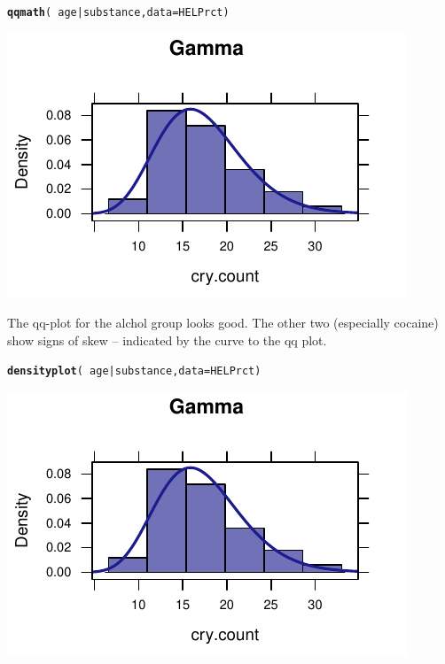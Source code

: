 \documentclass[twoside]{book}\usepackage[]{graphicx}\usepackage[]{xcolor}
\makeatletter
\def\maxwidth{ %
  \ifdim\Gin@nat@width>\linewidth
    \linewidth
  \else
    \Gin@nat@width
  \fi
}
\newcommand{\hlopt}[1]{\textcolor[rgb]{0,0,0}{#1}}%
\newcommand{\hlstd}[1]{\textcolor[rgb]{0.345,0.345,0.345}{#1}}%
\newcommand{\hlkwc}[1]{\textcolor[rgb]{0.333,0.667,0.333}{#1}}%
\newcommand{\hlkwd}[1]{\textcolor[rgb]{0.737,0.353,0.396}{\textbf{#1}}}%
\newenvironment{kframe}{%
 \def\at@end@of@kframe{}%
 \ifinner\ifhmode%
  \def\at@end@of@kframe{\end{minipage}}%
  \begin{minipage}{\columnwidth}%
 \fi\fi%
 \def\FrameCommand##1{\hskip\@totalleftmargin \hskip-\fboxsep
 \colorbox{shadecolor}{##1}\hskip-\fboxsep
     \hskip-\linewidth \hskip-\@totalleftmargin \hskip\columnwidth}%
 \MakeFramed {\advance\hsize-\width
   \@totalleftmargin\z@ \linewidth\hsize
   \@setminipage}}%
 {\par\unskip\endMakeFramed%
 \at@end@of@kframe}
\newenvironment{knitrout}{}{} %
\makeatother
\begin{document}
\begin{solution}
\begin{knitrout}
\color{fgcolor}\begin{kframe}
\begin{alltt}
\hlkwd{qqmath}\hlstd{(}\hlopt{~}\hlstd{age} \hlopt{|} \hlstd{substance,} \hlkwc{data} \hlstd{= HELPrct)}
\end{alltt}
\end{kframe}

{\centering \includegraphics[width=\maxwidth]{figures/fig-unnamed-chunk-118-1} 

}



\end{knitrout}
The qq-plot for the alchol group looks good.  The other two (especially cocaine) show
signs of skew -- indicated by the curve to the qq plot.
\begin{knitrout}
\color{fgcolor}\begin{kframe}
\begin{alltt}
\hlkwd{densityplot}\hlstd{(}\hlopt{~}\hlstd{age} \hlopt{|} \hlstd{substance,} \hlkwc{data} \hlstd{= HELPrct)}
\end{alltt}
\end{kframe}

{\centering \includegraphics[width=\maxwidth]{figures/fig-unnamed-chunk-119-1} 

}



\end{knitrout}
\end{solution}
\end{document}
